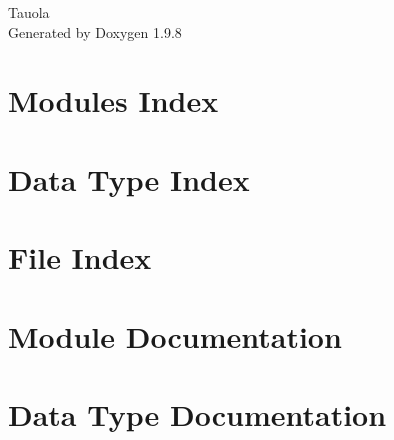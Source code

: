 \documentclass[twoside]{book}
\newcommand{\+}{\discretionary{\mbox{\scriptsize$\hookleftarrow$}}{}{}}
\newcommand{\clearemptydoublepage}{%
    \newpage{\pagestyle{empty}\cleardoublepage}%
  }
\begin{document}
  \raggedbottom
    \hypersetup{pageanchor=false,
                bookmarksnumbered=true,
                pdfencoding=unicode
               }
  \begin{titlepage}
  \vspace*{7cm}
  \begin{center}%
  {\Large Tauola}\\
  \vspace*{1cm}
  {\large Generated by Doxygen 1.9.8}\\
  \end{center}
  \end{titlepage}
  \clearemptydoublepage
  \tableofcontents
  \clearemptydoublepage
  \hypersetup{pageanchor=true}


\chapter{Modules Index}

\chapter{Data Type Index}

\chapter{File Index}

\chapter{Module Documentation}

\chapter{Data Type Documentation}

\end{document}
